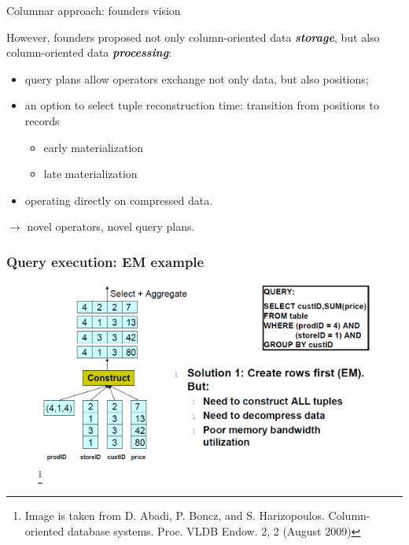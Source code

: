 \documentclass[compress, dvipsnames, unicode]{beamer}
\begin{document}
\begin{frame}{Columnar approach: founders vision}

However, founders proposed not only column-oriented data \textbf{\textit{storage}}, but also column-oriented data \textbf{\textit{processing}}:

\begin{itemize}	
    \item query plans allow operators exchange not only data, but also positions;
    \item an option to select tuple reconstruction time: transition from positions to records
	\begin{itemize}
		\item early materialization
		\item late materialization
	\end{itemize}
	\item operating directly on compressed data.
\end{itemize}
$\longrightarrow$ novel operators, novel query plans.

\end{frame}

\begin{frame}
\frametitle{Query execution: EM example}

\begin{figure}[htb]
	\includegraphics[width=\textwidth,height=0.75\textheight,keepaspectratio]{em.png} 
	\footnote{\tiny{Image is taken from D. Abadi, P. Boncz, and S. Harizopoulos. Column-oriented database systems. Proc. VLDB Endow. 2, 2 (August 2009)}}
\end{figure}    

\end{frame}
\end{document}
